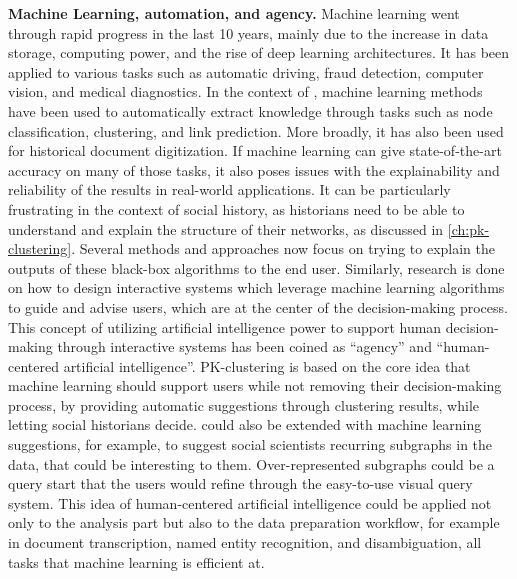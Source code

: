 \noindent\textbf{Machine Learning, automation, and agency.} Machine learning went through rapid progress in the last 10 years, mainly due to the increase in data storage, computing power, and the rise of deep learning architectures.
It has been applied to various tasks such as automatic driving, fraud detection, computer vision, and medical diagnostics.
In the context of \sna, machine learning methods have been used to automatically extract knowledge through tasks such as node classification, clustering, and link prediction\cite{michalskiPredictingSocialNetwork2012}.
More broadly, it has also been used for historical document digitization\cite{philipsHistoricalDocumentProcessing2020}.
If machine learning can give state-of-the-art accuracy on many of those tasks, it also poses issues with the explainability and reliability of the results in real-world applications.
It can be particularly frustrating in the context of social history, as historians need to be able to understand and explain the structure of their networks, as discussed in \autoref{ch:pk-clustering}.
Several methods and approaches now focus on trying to explain the outputs of these black-box algorithms to the end user\cite{holzingerMachineLearningExplainable2018}.
Similarly, research is done on how to design interactive systems which leverage machine learning algorithms to guide and advise users, which are at the center of the decision-making process.
This concept of utilizing artificial intelligence power to support human decision-making through interactive systems has been coined as ``agency''\cite{heerAgencyAutomationDesigning2019} and ``human-centered artificial intelligence''\cite{shneidermanHumanCenteredAI2022}.
PK-clustering is based on the core idea that machine learning should support users while not removing their decision-making process, by providing automatic suggestions through clustering results, while letting social historians decide.
\name could also be extended with machine learning suggestions, for example, to suggest social scientists recurring subgraphs in the data, that could be interesting to them.
Over-represented subgraphs could be a query start that the users would refine through the easy-to-use visual query system.
This idea of human-centered artificial intelligence could be applied not only to the analysis part but also to the data preparation workflow, for example in document transcription, named entity recognition, and disambiguation, all tasks that machine learning is efficient at.


